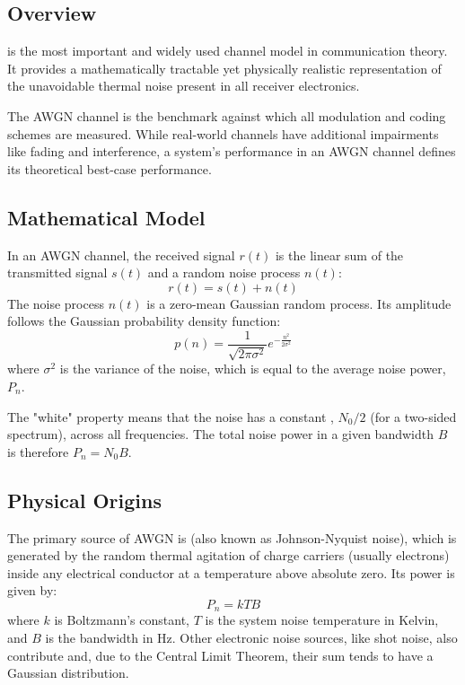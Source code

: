 \subsection{Overview}

 is the most important and widely used channel model in communication theory. It provides a mathematically tractable yet physically realistic representation of the unavoidable thermal noise present in all receiver electronics.

\begin{keyconcept}
    The AWGN channel is the benchmark against which all modulation and coding schemes are measured. While real-world channels have additional impairments like fading and interference, a system's performance in an AWGN channel defines its theoretical best-case performance.
\end{keyconcept}


\subsection{Mathematical Model}

In an AWGN channel, the received signal $r(t)$ is the linear sum of the transmitted signal $s(t)$ and a random noise process $n(t)$:
\begin{equation}
    r(t) = s(t) + n(t)
\end{equation}
The noise process $n(t)$ is a zero-mean Gaussian random process. Its amplitude follows the Gaussian probability density function:
\begin{equation}
    p(n) = \frac{1}{\sqrt{2\pi\sigma^2}} e^{-\frac{n^2}{2\sigma^2}}
\end{equation}
where $\sigma^2$ is the variance of the noise, which is equal to the average noise power, $P_n$.

The "white" property means that the noise has a constant , $N_0/2$ (for a two-sided spectrum), across all frequencies. The total noise power in a given bandwidth $B$ is therefore $P_n = N_0 B$.


\subsection{Physical Origins}

The primary source of AWGN is  (also known as Johnson-Nyquist noise), which is generated by the random thermal agitation of charge carriers (usually electrons) inside any electrical conductor at a temperature above absolute zero. Its power is given by:
\begin{equation}
    P_n = kTB
\end{equation}
where $k$ is Boltzmann's constant, $T$ is the system noise temperature in Kelvin, and $B$ is the bandwidth in Hz. Other electronic noise sources, like shot noise, also contribute and, due to the Central Limit Theorem, their sum tends to have a Gaussian distribution.



